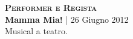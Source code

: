 \textbf{\textsc{Performer e Regista}} \\
\textbf{Mamma Mia!} | 26 Giugno 2012 \\
Musical a teatro.
\begin{center}
    \label{fig:mamma_mia}	
\end{center}